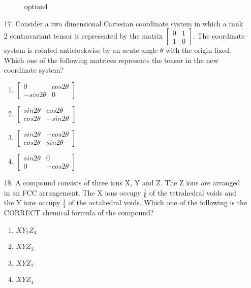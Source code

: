 \documentclass[journal]{IEEEtran}
\begin{document}
\begin{enumerate}
\begin{figure}[!ht]
{\begin{circuitikz}
    \end{circuitikz}
    }%
        \caption{option4}
    \end{figure}
    \item[17.] Consider a two dimensional Cartesian coordinate system in which a rank 2
    contravariant tensor is represented by the matrix $\begin{bmatrix}0&1\\1&0\end{bmatrix}$. The coordinate system
    is rotated anticlockwise by an acute angle $\theta$ with the origin fixed. Which one of
    the following matrices represents the tensor in the new coordinate system?
    \begin{enumerate}[label = (\Alph*)]
        \item $\begin{bmatrix}0&cos2\theta\\-sin2\theta&0\end{bmatrix}$
        \item $\begin{bmatrix}sin2\theta&cos2\theta\\cos2\theta&-sin2\theta\end{bmatrix}$
        \item $\begin{bmatrix}sin2\theta&-cos2\theta\\cos2\theta&sin2\theta\end{bmatrix}$
        \item $\begin{bmatrix}sin2\theta&0\\0&-cos2\theta\end{bmatrix}$
    \end{enumerate}
    \item[18.] A compound consists of three ions X, Y and Z. The Z ions are arranged in an FCC
    arrangement. The X ions occupy $\frac{1}{6}$ of the tetrahedral voids and the Y ions occupy
    $\frac{1}{3}$ of the octahedral voids. Which one of the following is the CORRECT chemical
    formula of the compound? 
    \begin{enumerate}[label = (\Alph*)]
        \item $XY_2Z_4$
        \item $XYZ_3$
        \item $XYZ_2$
        \item $XYZ_4$
    \end{enumerate}
    \newpage

\end{enumerate}
\end{document}

